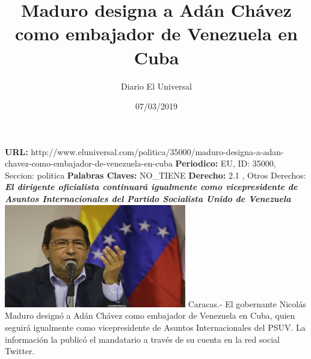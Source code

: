 \documentclass{article}%
\title{\textbf{Maduro designa a Adán Chávez como embajador de Venezuela en Cuba}}%
\author{Diario El Universal}%
\date{07/03/2019}%
\begin{document}
%
\normalsize%
\maketitle%
\textbf{URL: }%
http://www.eluniversal.com/politica/35000/maduro{-}designa{-}a{-}adan{-}chavez{-}como{-}embajador{-}de{-}venezuela{-}en{-}cuba\newline%
%
\textbf{Periodico: }%
EU, %
ID: %
35000, %
Seccion: %
politica\newline%
%
\textbf{Palabras Claves: }%
NO\_TIENE\newline%
%
\textbf{Derecho: }%
2.1%
, Otros Derechos: %
\newline%
%
\textbf{\textit{El dirigente oficialista continuará igualmente como vicepresidente de Asuntos Internacionales del Partido Socialista Unido de Venezuela}}%
\newline%
\newline%
%
\includegraphics[width=300px]{EU_35000.jpg}%
\newline%
%
Caracas.{-} El gobernante Nicolás Maduro designó a Adán Chávez como embajador de Venezuela en Cuba, quien seguirá igualmente como vicepresidente de Asuntos Internacionales del PSUV.%
\newline%
%
La información la publicó el mandatario a través de su cuenta en la red social Twitter.%
\newline%
%
\end{document}
